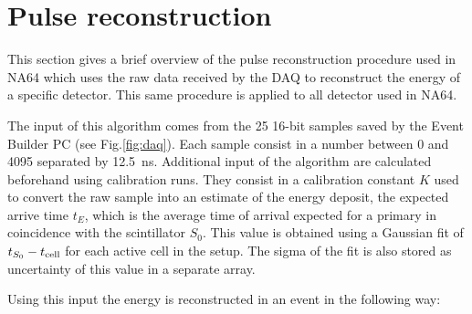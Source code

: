 \section{Pulse reconstruction}

This section gives a brief overview of the pulse reconstruction procedure used in NA64 which uses the raw data received by the DAQ to reconstruct the energy of a specific detector. This same procedure is applied to all detector used in NA64.

The input of this algorithm comes from the 25 16-bit samples saved by the Event Builder PC (see Fig.\ref{fig:daq}). Each sample consist in a number between 0 and 4095 separated by \SI{12.5}{\nano\second}. Additional input of the algorithm are calculated beforehand using calibration runs. They consist in a calibration constant $K$ used to convert the raw sample into an estimate of the energy deposit, the expected arrive time $t_E$, which is the average time of arrival expected for a primary in coincidence with the scintillator $S_0$. This value is obtained using a Gaussian fit of $t_{S_0} - t_{\rm{cell}}$ for each active cell in the setup. The sigma of the fit is also stored as uncertainty of this value in a separate array.

Using this input the energy is reconstructed in an event in the following way:


